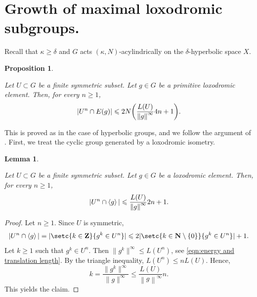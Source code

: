 \documentclass[leqno,a4paper,10pt]{amsart}
\theoremstyle{plain}
\newtheorem{prop}[thm]{Proposition}
\newtheorem{lem}[thm]{Lemma}
\theoremstyle{definition}
\theoremstyle{remark}
\newcommand{\N}{\mathbf{N}}
\newcommand{\Z}{\mathbf{Z}}
\let\le\leqslant
\let\ge\geqslant
\newcommand{\group}[1]{
	\mathchoice%
	{\left\langle #1\right\rangle}%
	{\langle #1\rangle}%
	{\langle #1\rangle}%
	{\langle #1\rangle}%
}
\newcommand{\stlen}[1]{
	\left\| #1\right\|^{\infty}
}
\begin{document}
\section{Growth of maximal loxodromic subgroups.}

Recall that $\kappa\geqslant \delta$ and $G$ acts $(\kappa,N)$-acylindrically on the $\delta$-hyperbolic space $X$.  


\begin{prop}
	
	\label{prop:growth-loxodromic-subgroups}
	
Let $U \subset G$ be a finite symmetric subset. Let $g\in G$ be a primitive loxodromic element. Then, for every $n \ge 1$,
	$$|U^n\cap E(g)| \le 2N\qty(\frac{L(U)}{\stlen{g}}4n+1).$$
	
\end{prop}

 This is proved as in the case of hyperbolic groups, and we follow the argument of \cite[p.~484]{antolin_degree_2017}. 
First, we treat the cyclic group generated by a loxodromic isometry.

\begin{lem}
	
	\label{lem:growth-cyclic-loxodromic-subgroups}
	
Let $U\subset G$ be a finite symmetric subset. Let $g\in G$ be a loxodromic element. Then, for every $n \ge 1$,
	$$|U^n\cap\group{g}|\le \frac{L(U)}{\stlen{g}}2n+1.$$
	
\end{lem}

\begin{proof}
	
	Let $n \ge 1$. 
	Since $U$ is symmetric,
	$$|U^n\cap \group{g}|=|\setc{k \in \Z}{g^k \in U^n}|\le 2|\setc{k\in \N\setminus \{0\}}{g^k\in U^n}|+1.$$
	Let $k \ge 1$ such that $g^k \in U^n$. 
Then $\|g^k\|^{\infty}\le L(U^n)$, see \eqref{eqn:energy and translation length}. By the triangle inequality, $L(U^n)\le nL(U)$. Hence,
	$$k=\frac{\|g^k\|^{\infty}}{\|g\|^{\infty}} \le \frac{L(U)}{\stlen{g}}n.$$ 
This yields the claim. 	
\end{proof}
\end{document}
